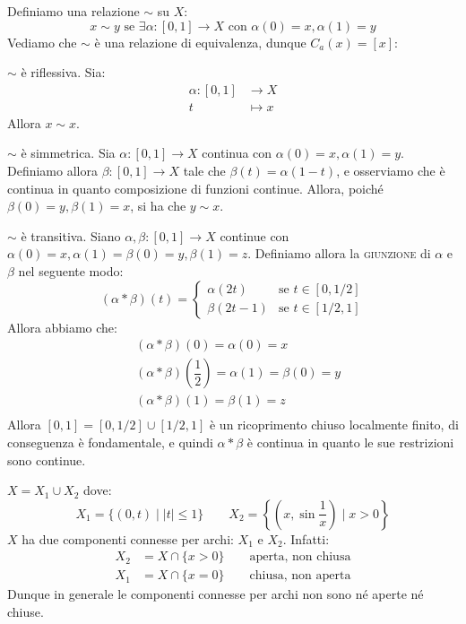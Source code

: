 Definiamo una relazione $\sim$ su $X$:
$$x \sim y \text{ se } \exists \alpha:[0,1] \longrightarrow X \text{ con } \alpha(0)=x, \alpha(1)=y$$
Vediamo che $\sim$ è una relazione di equivalenza, dunque $C_a(x)=[x]$:
\begin{nlist}
\item $\sim$ è riflessiva. Sia:
\begin{align*}
\alpha:[0,1] &\longrightarrow X \\
t &\longmapsto x
\end{align*}
Allora $x \sim x$.
\item $\sim$ è simmetrica. Sia $\alpha:[0,1] \longrightarrow X$ continua con $\alpha(0)=x,\alpha(1)=y$. Definiamo allora $\beta:[0,1]\longrightarrow X$ tale che $\beta (t)=\alpha (1-t)$, e osserviamo che è continua in quanto composizione di funzioni continue. Allora, poiché $\beta (0)=y, \beta(1)=x$, si ha che $y \sim x$.
\item $\sim$ è transitiva. Siano $\alpha,\beta :[0,1]\longrightarrow X$ continue con $\alpha(0)=x, \alpha(1)=\beta(0)=y, \beta(1)=z$. Definiamo allora la \textsc{giunzione} di $\alpha$ e $\beta$ nel seguente modo:
$$
(\alpha * \beta)(t)=\begin{cases} \alpha (2t) & \mbox{se }t \in [0, 1/2] \\ \beta (2t-1) & \mbox{se }t \in [1/2,1]
\end{cases}
$$
Allora abbiamo che:
\begin{align*}
&(\alpha * \beta)(0) = \alpha (0) =x \\
&(\alpha * \beta)\left(\dfrac{1}{2}\right) =\alpha (1) = \beta (0)=y\\
&(\alpha * \beta)(1) = \beta (1) =z\\
\end{align*}
Allora $[0,1]=[0,1/2] \cup [1/2,1]$ è un ricoprimento chiuso localmente finito, di conseguenza è fondamentale, e quindi $\alpha * \beta$ è continua in quanto le sue restrizioni sono continue.
\end{nlist}

\begin{ex}
$X=X_1 \cup X_2$ dove:
$$ X_1=\{(0,t) \mid |t| \le 1\} \qquad X_2=\left\{ \left(x,\sin \dfrac{1}{x}\right) \mid x>0 \right\}$$
$X$ ha due componenti connesse per archi: $X_1$ e $X_2$. Infatti:
\begin{align*}
X_2&=X \cap \{x>0\} \qquad \text{aperta, non chiusa}\\
X_1&=X \cap \{x=0\} \qquad \text{chiusa, non aperta}
\end{align*}
Dunque in generale le componenti connesse per archi non sono né aperte né chiuse.
\end{ex}

